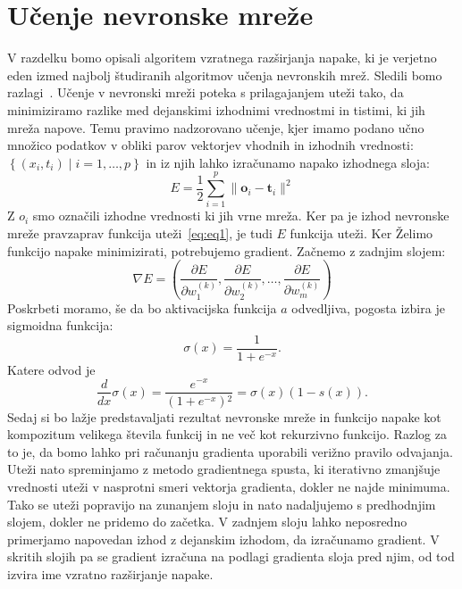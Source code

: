 \section{Učenje nevronske mreže}
V razdelku bomo opisali algoritem vzratnega razširjanja napake, ki je verjetno eden izmed najbolj študiranih algoritmov učenja nevronskih mrež. Sledili bomo razlagi~\cite{rojas1996backpropagation}.
Učenje v nevronski mreži poteka s prilagajanjem uteži tako, da minimiziramo razlike med dejanskimi izhodnimi vrednostmi in tistimi, ki jih mreža napove. Temu pravimo nadzorovano učenje, kjer imamo podano učno množico podatkov v obliki parov vektorjev vhodnih in izhodnih vrednosti: $\left\{ (x_i, t_i) \mid i = 1, \ldots, p \right\}$ in iz njih lahko izračunamo napako izhodnega sloja: 
\begin{equation}
    E = \frac{1}{2} \sum_{i=1}^{p} \|\mathbf{o}_i - \mathbf{t}_i\|^2 
\end{equation}
Z $o_{i}$ smo označili izhodne vrednosti ki jih vrne mreža. Ker pa je izhod nevronske mreže pravzaprav funkcija uteži~\ref{eq:eq1}, je tudi $E$ funkcija uteži. Ker Želimo funkcijo napake minimizirati, potrebujemo gradient. Začnemo z zadnjim slojem: 
\begin{equation}
    \nabla E = \left( \frac{\partial E}{\partial w^{(k)}_1}, \frac{\partial E}{\partial w^{(k)}_2}, \ldots, \frac{\partial E}{\partial w^{(k)}_m} \right)
\end{equation}
Poskrbeti moramo, še da bo aktivacijska funkcija $a$ odvedljiva, pogosta izbira je sigmoidna funkcija:
\begin{equation}
    \sigma(x) = \frac{1}{1 + e^{-x}}.
\end{equation}
Katere odvod je
\begin{equation}
    \frac{d}{dx}\sigma(x) = \frac{e^{-x}}{\left(1+e^{-x}\right){}^2} = \sigma(x)\left(1 - s(x)\right).
\end{equation}
Sedaj si bo lažje predstavaljati rezultat nevronske mreže in funkcijo napake kot kompozitum velikega števila funkcij in ne več kot rekurzivno funkcijo. Razlog za to je, da bomo lahko pri računanju gradienta uporabili verižno pravilo odvajanja. Uteži nato spreminjamo z metodo gradientnega spusta, ki iterativno zmanjšuje vrednosti uteži v nasprotni smeri vektorja gradienta, dokler ne najde minimuma. Tako se uteži popravijo na zunanjem sloju in nato nadaljujemo s predhodnjim slojem, dokler ne pridemo do začetka. V zadnjem sloju lahko neposredno primerjamo napovedan izhod z dejanskim izhodom, da izračunamo gradient. V skritih slojih pa se gradient izračuna na podlagi gradienta sloja pred njim, od tod izvira ime vzratno razširjanje napake.

